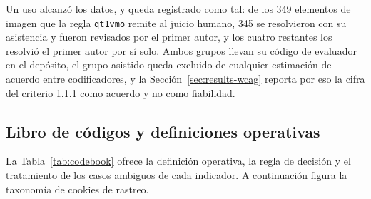 \documentclass[pdflatex,sn-basic,Numbered,iicol]{sn-jnl}
\theoremstyle{thmstyleone}
\theoremstyle{thmstyletwo}
\theoremstyle{thmstylethree}
\begin{document}
Un uso alcanz\'o los datos, y queda registrado como tal: de los 349 elementos de imagen que la regla \texttt{qt1vmo} remite al juicio humano, 345 se resolvieron con su asistencia y fueron revisados por el primer autor, y los cuatro restantes los resolvi\'o el primer autor por s\'i solo. Ambos grupos llevan su c\'odigo de evaluador en el dep\'osito, el grupo asistido queda excluido de cualquier estimaci\'on de acuerdo entre codificadores, y la Secci\'on~\ref{sec:results-wcag} reporta por eso la cifra del criterio 1.1.1 como acuerdo y no como fiabilidad.

\clearpage
\onecolumn
\begin{appendices}

\renewcommand{\thetable}{\thesection\arabic{table}}
\renewcommand{\thefigure}{\thesection\arabic{figure}}

\section{Libro de c\'odigos y definiciones operativas}\label{ap:codebook}
\setcounter{table}{0}\setcounter{figure}{0}

La Tabla~\ref{tab:codebook} ofrece la definici\'on operativa, la regla de decisi\'on y el tratamiento de los casos ambiguos de cada indicador. A continuaci\'on figura la taxonom\'ia de cookies de rastreo.


\end{appendices}
\end{document}

